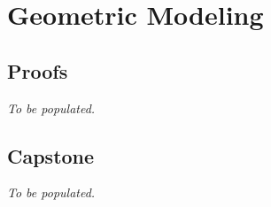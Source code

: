 \chapter{Geometric Modeling}

\clearpage

\clearpage

\section*{Proofs}
\textit{To be populated.}

\section*{Capstone}
\textit{To be populated.}

